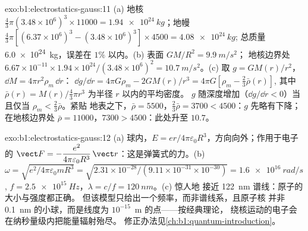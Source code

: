 \begin{solution}{exo:b1:electrostatics-gauss:11}
(a) 地核 $\tfrac43\pi(3.48 \times 10^6)^3 \times 11000 = \qty{1.94e24}{kg}$；地幔
$\tfrac43\pi[(6.37 \times 10^6)^3 - (3.48 \times 10^6)^3] \times 4500 = \qty{4.08e24}{kg}$;
总质量 \qty{6.0e24}{kg}，误差在 $1\%$ 以内。(b) 表面 $GM/R^2 = \qty{9.9}{m/s^2}$；
地核边界处 $6.67 \times 10^{-11} \times 1.94 \times 10^{24}/(3.48 \times 10^6)^2 =
\qty{10.7}{m/s^2}$。(c) 取 $g = GM(r)/r^2$，$\dd M = 4\pi r^2\rho_m\,\dd r$：
$\dd g/\dd r = 4\pi G\rho_m - 2GM(r)/r^3 = 4\pi G[\rho_m - \tfrac23\bar\rho(r)]$,
其中 $\bar\rho(r) = M(r)/\tfrac43\pi r^3$ 为半径 $r$ 以内的平均密度。
$g$ 随深度增加（$\dd g/\dd r < 0$）当且仅当 $\rho_m < \tfrac23\bar\rho$。紧贴
地表之下，$\bar\rho = 5500$，$\tfrac23\bar\rho = 3700 < 4500$：$g$
先略有下降；在地核边界处 $\bar\rho = 11000$，$7300 >
4500$：此处升至 $10.7$。
\end{solution}

\begin{solution}{exo:b1:electrostatics-gauss:12}
(a) 球内，$E = er/4\pi\varepsilon_0R^3$，方向向外；作用于电子的 $\vect F =
-\dfrac{e^2}{4\pi\varepsilon_0R^3}\,\vect r$：这是弹簧式的力。(b) $\omega = \sqrt{e^2/4\pi\varepsilon_0mR^3}
= \sqrt{2.31 \times 10^{-28}/(9.11 \times 10^{-31} \times 10^{-30})} = \qty{1.6e16}{rad/s}$,
$f = \qty{2.5e15}{Hz}$，$\lambda = c/f = \qty{120}{nm}$。(c) 惊人地
接近 \qty{122}{nm} 谱线：原子的大小与强度都正确。
但该模型只给出一个频率，而非谱线系，且原子核
并非 \qty{0.1}{nm} 的小球，而是线度为 $10^{-15}$~m 的点——按经典理论，
绕核运动的电子会在纳秒量级内把能量辐射殆尽。
修正办法见\cref{ch:b1:quantum-introduction}。
\end{solution}

